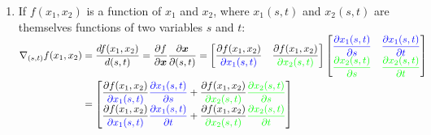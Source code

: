 \begin{enumerate}
    \item If $f (x_1, x_2)$ is a function of $x_1$ and $x_2$, where $x_1(s, t)$ and $x_2(s, t)$ are themselves functions of two variables $s$ and $t$:
    \\
    $
        \begin{aligned}
        \nabla_{(s,t)} f(x_1, x_2)
        &= \dfrac{df(x_1, x_2)}{d(s,t)}
        = \dfrac{\partial f}{\partial \bm{x}} \dfrac{\partial \bm{x}}{\partial (s,t)}
        = \begin{bmatrix}
            \dfrac{\partial f(x_1, x_2)}{\textcolor{blue}{\partial x_1(s,t)}} &
            \dfrac{\partial f(x_1, x_2)}{\textcolor{green}{\partial x_2(s,t)}}
        \end{bmatrix}
        \begin{bmatrix}
            \textcolor{blue}{\dfrac{\partial x_1(s,t)}{\partial s}} & \textcolor{blue}{\dfrac{\partial x_1(s,t)}{\partial t}} \\
            \textcolor{green}{\dfrac{\partial x_2(s,t)}{\partial s}} & \textcolor{green}{\dfrac{\partial x_2(s,t)}{\partial t}}
        \end{bmatrix}
        \\
        &= 
        \begin{bmatrix}
            \dfrac{\partial f(x_1, x_2)}{\textcolor{blue}{\partial x_1(s,t)}}
            \textcolor{blue}{\dfrac{\partial x_1(s,t)}{\partial s}} +
            \dfrac{\partial f(x_1, x_2)}{\textcolor{green}{\partial x_2(s,t)}}
            \textcolor{green}{\dfrac{\partial x_2(s,t)}{\partial s}} \\ 
            \dfrac{\partial f(x_1, x_2)}{\textcolor{blue}{\partial x_1(s,t)}}
            \textcolor{blue}{\dfrac{\partial x_1(s,t)}{\partial t}} +
            \dfrac{\partial f(x_1, x_2)}{\textcolor{green}{\partial x_2(s,t)}}
            \textcolor{green}{\dfrac{\partial x_2(s,t)}{\partial t}}
        \end{bmatrix}
        \end{aligned}
    $
    \hfill \cite{mfml/book/mml/Deisenroth-Faisal-Ong}
    
\end{enumerate}


























